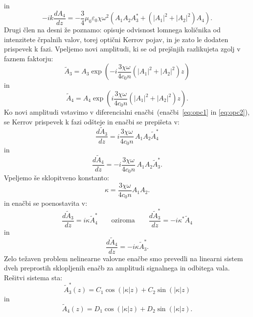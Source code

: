 in 
\begin{equation}
-i k \frac{dA_4}{dz} = - \frac{3}{4} \mu_0\varepsilon_0 \chi \omega^2 
\left( A_1 A_2 A_3^*+ (|A_1|^2 + |A_2|^2) A_4 \right)\!\!.
\label{eq:opc2}
\end{equation}
Drugi člen na desni že poznamo: opisuje odvisnost lomnega količnika
od intenzitete črpalnih valov, torej optični Kerrov
pojav, in je zato le dodaten prispevek
k fazi. Vpeljemo novi amplitudi, ki se od prejšnjih razlikujeta zgolj v faznem faktorju:
\begin{equation}
\tilde{A}_3 = A_3 \exp\left(-i\frac{ 3 \chi \omega}{4 c_0 n}(|A_1|^2 + |A_2|^2) z\right)
\end{equation}
in 
\begin{equation}
\tilde{A}_4 = A_4 \exp\left(i\frac{ 3 \chi \omega}{4 c_0 n}(|A_1|^2 + |A_2|^2)z\right)\!\!.
\end{equation}
Ko novi amplitudi vstavimo v diferencialni enačbi~(enačbi~\ref{eq:opc1} in 
\ref{eq:opc2}), se Kerrov prispevek k fazi odšteje
in enačbi se prepišeta v:
\begin{equation}
\frac{d\tilde{A}_{3}}{dz}=i\frac{ 3 \chi \omega}{4 c_0 n}\,
A_{1}A_{2}\tilde{A}_{4}^{*}
\end{equation}
in
\begin{equation}
\frac{d\tilde{A}_{4}}{dz}=-i\frac{ 3 \chi \omega}{4 c_0 n}\,
A_{1}A_{2}\tilde{A}_{3}^*.
\label{8.105}
\end{equation}
Vpeljemo še sklopitveno konstanto:
\begin{equation}
\kappa=\frac{ 3 \chi \omega}{4 c_0 n}A_1 A_2.
\label{8.106}
\end{equation}
 in enačbi se poenostavita v:
\begin{equation}
\frac{d\tilde{A}_{3}}{dz}=i\kappa \tilde{A}_{4}^{*} \qquad
\textrm{oziroma} \qquad \frac{d\tilde{A}^*_{3}}{dz}=-i\kappa^* \tilde{A}_{4} 
\label{8.107}
\end{equation}
in
\begin{equation}
\frac{d\tilde{A}_{4}}{dz}=-i\kappa \tilde{A}_{3}^*.
\label{8.107a}
\end{equation}
Zelo težaven problem nelinearne valovne enačbe smo prevedli na linearni
sistem dveh preprostih sklopljenih enačb za amplitudi signalnega in
odbitega vala. Rešitvi sistema sta:
\begin{equation}
\tilde{A}_3^* \left(z\right) =  C_{1}\cos(\left|\kappa\right|z)+
C_{2}\sin(\left|\kappa\right|z)
\end{equation}
in
\begin{equation}
\tilde{A}_4 \left(z\right) =  D_{1}\cos(\left|\kappa\right|z)+
D_{2}\sin(\left|\kappa\right|z).
\label{8.108a}
\end{equation}


